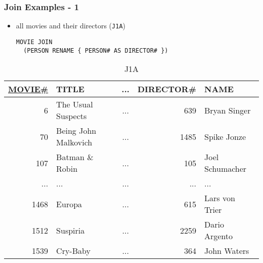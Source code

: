 \documentclass[dvipsnames]{beamer}
\theoremstyle{plain}
\begin{document}
\begin{frame}[fragile]
  \frametitle{Join Examples - 1}

  \begin{itemize}
    \item all movies and their directors (\texttt{J1A})
    \begin{lstlisting}
MOVIE JOIN
  (PERSON RENAME { PERSON# AS DIRECTOR# })
    \end{lstlisting}
  \end{itemize}

  \vspace{-10pt}
  \begin{tiny}
  \begin{table}
    \caption{J1A}
    \begin{tabular}{|r|l|c|r|l|}\hline
\underline{MOVIE\#} & TITLE & ... & DIRECTOR\# & NAME            \\[2pt]\hline\hline
   6 & The Usual Suspects   & ... &       639  & Bryan Singer    \\\hline
  70 & Being John Malkovich & ... &      1485  & Spike Jonze     \\\hline
 107 & Batman \& Robin      & ... &       105  & Joel Schumacher \\\hline
 ... & ...                  & ... &       ...  & ...             \\\hline
1468 & Europa               & ... &       615  & Lars von Trier  \\\hline
1512 & Suspiria             & ... &      2259  & Dario Argento   \\\hline
1539 & Cry-Baby             & ... &       364  & John Waters     \\\hline
    \end{tabular}
  \end{table}
  \end{tiny}
\end{frame}
\end{document}

